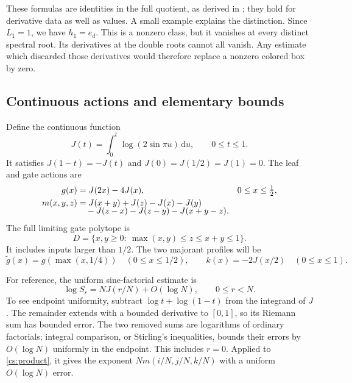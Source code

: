 \documentclass[11pt]{article}
\theoremstyle{remark}\newtheorem{remark}[theorem]{Remark}
\numberwithin{equation}{section}
\newcommand{\dd}{\,\mathrm d}
\begin{document}
These formulas are identities in the full quotient, as derived in
\cite{Newton}; they hold for derivative data as well as values. A small
example explains the distinction. Since $L_1=1$, we have $h_1=e_d$.
This is a nonzero class, but it vanishes at every distinct spectral
root. Its derivatives at the double roots cannot all vanish. Any
estimate which discarded those derivatives would therefore replace a
nonzero colored box by zero.

\subsection{Continuous actions and elementary bounds}\label{cs:actions}
Define the continuous function
\begin{equation}\label{cs:J}
 J(t)=\int_0^t\log(2\sin\pi u)\dd u,\qquad 0\le t\le1.
\end{equation}
It satisfies $J(1-t)=-J(t)$ and $J(0)=J(1/2)=J(1)=0$. The leaf and gate actions are
\begin{align}
 g(x)&=J(2x)-4J(x),&0\le x\le\tfrac12,\label{cs:g}\\
 m(x,y,z)&=J(x+y)+J(z)-J(x)-J(y)\notag\\[-2mm]
 &\quad-J(z-x)-J(z-y)-J(x+y-z).\label{cs:m}
\end{align}
The full limiting gate polytope is
\begin{equation}\label{cs:D}
 D=\{x,y\ge0:\ \max(x,y)\le z\le x+y\le1\}.
\end{equation}
It includes inputs larger than $1/2$. The two majorant profiles will be
\begin{equation}\label{cs:profiles}
 \widetilde g(x)=g(\max(x,1/4))\quad(0\le x\le1/2),
 \qquad k(x)=-2J(x/2)\quad(0\le x\le1).
\end{equation}

For reference, the uniform sine-factorial estimate is
\begin{equation}\label{cs:factorial}
 \log S_r=NJ(r/N)+O(\log N),\qquad 0\le r<N.
\end{equation}
To see endpoint uniformity, subtract $\log t+\log(1-t)$ from the integrand of $J$. The remainder extends with a bounded derivative to $[0,1]$, so its Riemann sum has bounded error. The two removed sums are logarithms of ordinary factorials; integral comparison, or Stirling's inequalities, bounds their errors by $O(\log N)$ uniformly in the endpoint. This includes $r=0$. Applied to \eqref{cs:product}, it gives the exponent $Nm(i/N,j/N,k/N)$ with a uniform $O(\log N)$ error.
\end{document}
